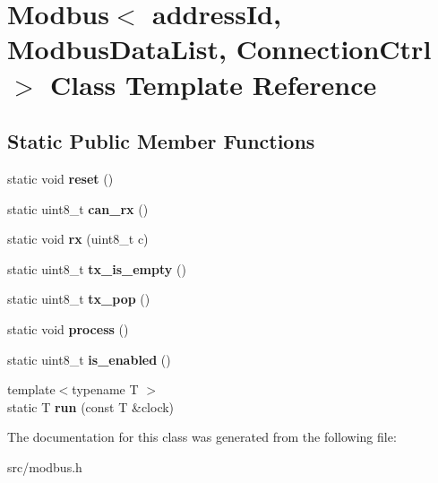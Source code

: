 \hypertarget{classModbus}{}\section{Modbus$<$ address\+Id, Modbus\+Data\+List, Connection\+Ctrl $>$ Class Template Reference}
\label{classModbus}
\subsection*{Static Public Member Functions}
\begin{DoxyCompactItemize}
\item 
static void {\bfseries reset} ()\hypertarget{classModbus_af1b825d738f689a73996322cb97a3731}{}\label{classModbus_af1b825d738f689a73996322cb97a3731}

\item 
static uint8\+\_\+t {\bfseries can\+\_\+rx} ()\hypertarget{classModbus_aa01e2f99ffceaf529d50a046c181cb6f}{}\label{classModbus_aa01e2f99ffceaf529d50a046c181cb6f}

\item 
static void {\bfseries rx} (uint8\+\_\+t c)\hypertarget{classModbus_af8c1c0ad33aae3f95654dde48e899dbe}{}\label{classModbus_af8c1c0ad33aae3f95654dde48e899dbe}

\item 
static uint8\+\_\+t {\bfseries tx\+\_\+is\+\_\+empty} ()\hypertarget{classModbus_a0a043d814f91d12d22abeb756ec56391}{}\label{classModbus_a0a043d814f91d12d22abeb756ec56391}

\item 
static uint8\+\_\+t {\bfseries tx\+\_\+pop} ()\hypertarget{classModbus_a13acf7f89171aeda9822d47d53cf178b}{}\label{classModbus_a13acf7f89171aeda9822d47d53cf178b}

\item 
static void {\bfseries process} ()\hypertarget{classModbus_a71101c24dca8e920e83baf536433c4c1}{}\label{classModbus_a71101c24dca8e920e83baf536433c4c1}

\item 
static uint8\+\_\+t {\bfseries is\+\_\+enabled} ()\hypertarget{classModbus_af486735a2aa3a896e02753bd58c6dd9a}{}\label{classModbus_af486735a2aa3a896e02753bd58c6dd9a}

\item 
{\footnotesize template$<$typename T $>$ }\\static T {\bfseries run} (const T \&clock)\hypertarget{classModbus_a2d1a0d2149fd976590667356aa983343}{}\label{classModbus_a2d1a0d2149fd976590667356aa983343}

\end{DoxyCompactItemize}


The documentation for this class was generated from the following file\+:\begin{DoxyCompactItemize}
\item 
src/modbus.\+h\end{DoxyCompactItemize}
